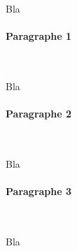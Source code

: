 Bla



\paragraph*{Paragraphe 1}
~\\
\hskip7mm

Bla

\paragraph*{Paragraphe 2}
~\\
\hskip7mm

Bla

\paragraph*{Paragraphe 3}
~\\
\hskip7mm

Bla